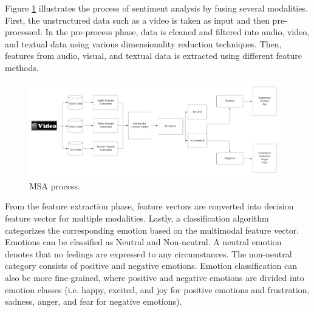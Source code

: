 Figure \ref{fig:msa_process} illustrates the process of sentiment analysis by fusing several modalities. First, the unstructured data such as a video is taken as input and then pre-processed. In the pre-process phase, data is cleaned and filtered into audio, video, and textual data using various dimensionality reduction techniques. Then, features from audio, visual, and textual data is extracted using different feature methods.  
%
\begin{figure}[h]
  \centering
  \includegraphics[width=1.0\textwidth]{figures/msa_process.png}
  \caption{MSA process.}
  \label{fig:msa_process}
\end{figure}
%
From the feature extraction phase, feature vectors are converted into decision feature vector for multiple modalities. Lastly, a classification algorithm categorizes the corresponding emotion based on the multimodal feature vector. Emotions can be classified as Neutral and Non-neutral. A neutral emotion denotes that no feelings are expressed to any circumstances. The non-neutral category consists of positive and negative emotions. Emotion classification can also be more fine-grained, where positive and negative emotions are divided into emotion classes (i.e. happy, excited, and joy for positive emotions and frustration, sadness, anger, and fear for negative emotions).

